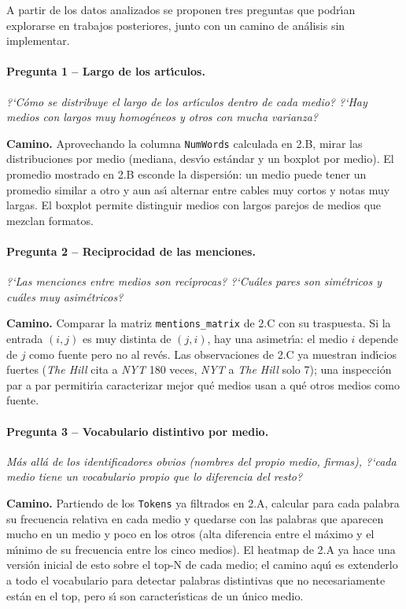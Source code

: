 \documentclass[11pt,a4paper]{article}
\begin{document}
A partir de los datos analizados se proponen tres preguntas que podr\'{\i}an explorarse en trabajos posteriores, junto con un camino de an\'{a}lisis sin implementar.

\paragraph{Pregunta 1 -- Largo de los art\'{\i}culos.}
\textit{?`C\'{o}mo se distribuye el largo de los art\'{\i}culos dentro de cada medio? ?`Hay medios con largos muy homog\'{e}neos y otros con mucha varianza?}

\textbf{Camino.} Aprovechando la columna \texttt{NumWords} calculada en 2.B, mirar las distribuciones por medio (mediana, desv\'{\i}o est\'{a}ndar y un boxplot por medio). El promedio mostrado en 2.B esconde la dispersi\'{o}n: un medio puede tener un promedio similar a otro y aun as\'{\i} alternar entre cables muy cortos y notas muy largas. El boxplot permite distinguir medios con largos parejos de medios que mezclan formatos.

\paragraph{Pregunta 2 -- Reciprocidad de las menciones.}
\textit{?`Las menciones entre medios son rec\'{\i}procas? ?`Cu\'{a}les pares son sim\'{e}tricos y cu\'{a}les muy asim\'{e}tricos?}

\textbf{Camino.} Comparar la matriz \texttt{mentions\_matrix} de 2.C con su traspuesta. Si la entrada $(i, j)$ es muy distinta de $(j, i)$, hay una asimetr\'{\i}a: el medio $i$ depende de $j$ como fuente pero no al rev\'{e}s. Las observaciones de 2.C ya muestran ind\'{\i}cios fuertes (\textit{The Hill} cita a \textit{NYT} 180 veces, \textit{NYT} a \textit{The Hill} solo 7); una inspecci\'{o}n par a par permitir\'{\i}a caracterizar mejor qu\'{e} medios usan a qu\'{e} otros medios como fuente.

\paragraph{Pregunta 3 -- Vocabulario distintivo por medio.}
\textit{M\'{a}s all\'{a} de los identificadores obvios (nombres del propio medio, firmas), ?`cada medio tiene un vocabulario propio que lo diferencia del resto?}

\textbf{Camino.} Partiendo de los \texttt{Tokens} ya filtrados en 2.A, calcular para cada palabra su frecuencia relativa en cada medio y quedarse con las palabras que aparecen mucho en un medio y poco en los otros (alta diferencia entre el m\'{a}ximo y el m\'{\i}nimo de su frecuencia entre los cinco medios). El heatmap de 2.A ya hace una versi\'{o}n inicial de esto sobre el top-N de cada medio; el camino aqu\'{\i} es extenderlo a todo el vocabulario para detectar palabras distintivas que no necesariamente est\'{a}n en el top, pero s\'{\i} son caracter\'{\i}sticas de un \'{u}nico medio.
\end{document}
